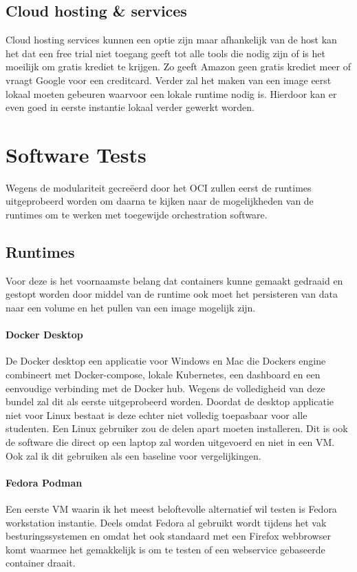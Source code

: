 \begin{itemize}
\subsection{Cloud hosting & services}
Cloud hosting services kunnen een optie zijn maar afhankelijk van de host kan het dat een free trial niet toegang geeft tot alle tools die nodig zijn of is het moeilijk om gratis krediet te krijgen. Zo geeft Amazon geen gratis krediet meer of vraagt Google voor een creditcard.  Verder zal het maken van een image eerst lokaal moeten gebeuren waarvoor een lokale runtime nodig is. Hierdoor kan er even goed in eerste instantie lokaal verder gewerkt worden.

\section{Software Tests}
Wegens de modulariteit gecreëerd door het OCI zullen eerst de runtimes uitgeprobeerd worden om daarna te kijken naar de mogelijkheden van de runtimes om te werken met toegewijde orchestration software.

\subsection{Runtimes}
Voor deze is het voornaamste belang dat containers kunne gemaakt gedraaid en gestopt worden door middel van de runtime ook moet het persisteren van data naar een volume en het pullen van een image mogelijk zijn.

\paragraph{Docker Desktop}
De Docker desktop een applicatie voor Windows en Mac die Dockers engine combineert met Docker-compose, lokale Kubernetes, een dashboard en een eenvoudige verbinding met de Docker hub. Wegens de volledigheid van deze bundel zal dit als eerste uitgeprobeerd worden. Doordat de desktop applicatie niet voor Linux bestaat is deze echter niet volledig toepasbaar voor alle studenten. Een Linux gebruiker zou de delen apart moeten installeren. Dit is ook de software die direct op een laptop zal worden uitgevoerd en niet in een VM. Ook zal ik dit gebruiken als een baseline voor vergelijkingen. 

\paragraph{Fedora Podman}
Een eerste VM waarin ik het meest beloftevolle alternatief wil testen is Fedora workstation instantie. Deels omdat Fedora al gebruikt wordt tijdens het vak besturingssystemen en omdat het ook standaard met een Firefox webbrowser komt waarmee het gemakkelijk is om te testen of een webservice gebaseerde container draait.


\end{itemize}
